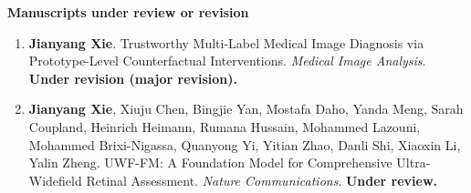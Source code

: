 \documentclass[11pt,a4paper]{article}
\begin{document}
\textbf{Manuscripts under review or revision}\par
\begin{enumerate}[start=6,label={\textcolor{accent}{\sffamily\footnotesize J\arabic*}},leftmargin=2.5em,itemsep=8pt,parsep=0pt]
\item \textbf{Jianyang Xie}. Trustworthy Multi-Label Medical Image Diagnosis via Prototype-Level Counterfactual Interventions. \textit{Medical Image Analysis}. \textbf{Under revision (major revision).}
\item \textbf{Jianyang Xie}, Xiuju Chen, Bingjie Yan, Mostafa Daho, Yanda Meng, Sarah Coupland, Heinrich Heimann, Rumana Hussain, Mohammed Lazouni, Mohammed Brixi-Nigassa, Quanyong Yi, Yitian Zhao, Danli Shi, Xiaoxin Li, Yalin Zheng. UWF-FM: A Foundation Model for Comprehensive Ultra-Widefield Retinal Assessment. \textit{Nature Communications}. \textbf{Under review.}
\end{enumerate}
\end{document}
